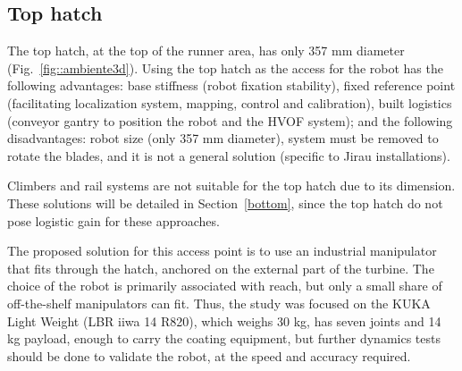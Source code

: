\subsection{Top hatch}
The top hatch, at the top of the runner area, has only 357 mm
diameter (Fig.~\ref{fig::ambiente3d}). Using the top hatch as
the access for the robot has the following advantages: base stiffness (robot
fixation stability), fixed reference point (facilitating localization system,
mapping, control and calibration), built logistics (conveyor gantry to position
the robot and the HVOF system); and the following disadvantages: robot
size (only 357 mm diameter), system must be removed to rotate the blades, and it
is not a general solution (specific to Jirau installations).



Climbers and rail systems are not suitable for the top hatch due to
its dimension. These solutions will be detailed in Section~\ref{bottom}, since
the top hatch do not pose logistic gain for these approaches.

The proposed solution for this access point is to use an industrial manipulator
that fits through the hatch, anchored on the external part of the turbine.  The
choice of the robot is primarily associated with reach, but only a small share
of off-the-shelf manipulators can fit. Thus, the study was focused on the KUKA
Light Weight (LBR iiwa 14 R820), which weighs 30 kg, has seven joints and 14 kg payload, enough to
carry the coating equipment, but further dynamics tests should be done to
validate the robot, at the speed and accuracy required.

